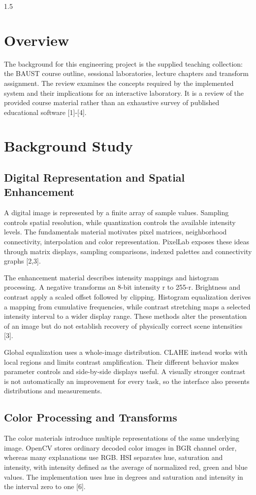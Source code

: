 \begin{spacing}{1.5}
\section{Overview}
The background for this engineering project is the supplied teaching collection: the BAUST course outline, sessional laboratories, lecture chapters and transform assignment. The review examines the concepts required by the implemented system and their implications for an interactive laboratory. It is a review of the provided course material rather than an exhaustive survey of published educational software [1]-[4].

\section{Background Study}
\subsection{Digital Representation and Spatial Enhancement}
A digital image is represented by a finite array of sample values. Sampling controls spatial resolution, while quantization controls the available intensity levels. The fundamentals material motivates pixel matrices, neighborhood connectivity, interpolation and color representation. PixelLab exposes these ideas through matrix displays, sampling comparisons, indexed palettes and connectivity graphs [2,3].

The enhancement material describes intensity mappings and histogram processing. A negative transforms an 8-bit intensity r to 255-r. Brightness and contrast apply a scaled offset followed by clipping. Histogram equalization derives a mapping from cumulative frequencies, while contrast stretching maps a selected intensity interval to a wider display range. These methods alter the presentation of an image but do not establish recovery of physically correct scene intensities [3].

Global equalization uses a whole-image distribution. CLAHE instead works with local regions and limits contrast amplification. Their different behavior makes parameter controls and side-by-side displays useful. A visually stronger contrast is not automatically an improvement for every task, so the interface also presents distributions and measurements.

\subsection{Color Processing and Transforms}
The color materials introduce multiple representations of the same underlying image. OpenCV stores ordinary decoded color images in BGR channel order, whereas many explanations use RGB. HSI separates hue, saturation and intensity, with intensity defined as the average of normalized red, green and blue values. The implementation uses hue in degrees and saturation and intensity in the interval zero to one [6].


\end{spacing}
